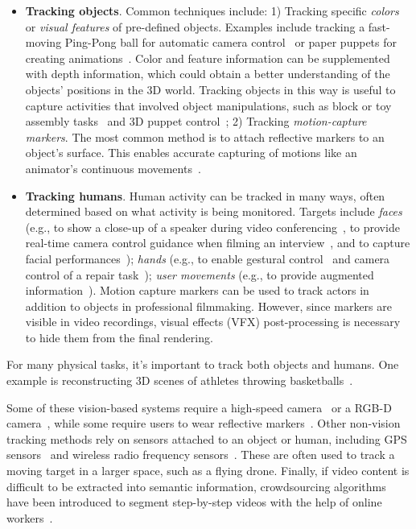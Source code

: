 \begin{itemize}
  \item \textbf{Tracking objects}. Common techniques include:
  1) Tracking specific \emph{colors} or \emph{visual features} of pre-defined objects. Examples include tracking a fast-moving Ping-Pong ball for automatic camera control~\cite{Okumura:2011tr} or paper puppets for creating animations~\cite{Barnes:2008:VideoPuppetry}.
  Color and feature information can be supplemented with depth information, which could obtain a better understanding of the objects’ positions in the 3D world. Tracking objects in this way is useful to capture activities that involved object manipulations, such as block or toy assembly tasks~\cite{Gupta2012DuploTrack,Wu:2016:ARI:2856400.2856416} and 3D puppet control~\cite{held20123d};
  2) Tracking \emph{motion-capture markers}. The most common method is to attach reflective markers to an object's surface. This enables accurate capturing of motions like an animator's continuous movements~\cite{Dontcheva:2003:LAC:1201775.882285}.
  \item \textbf{Tracking humans}. Human activity can be tracked in many ways, often determined based on what activity is being monitored.
  Targets include \emph{faces} (e.g., to show a close-up of a speaker during video conferencing~\cite{Ranjan:2010}, to provide real-time camera control guidance when filming an interview~\cite{Carter:2010}, and to capture facial performances~\cite{Shi:2014:AAH:2661229.2661290,thies2016face}); \emph{hands} (e.g., to enable gestural control~\cite{taylor-siggraph2016} and camera control of a repair task~\cite{Ranjan:2008}); \emph{user movements} (e.g., to provide augmented information~\cite{Wilson:2012fb,Anderson:2013:YEM:2501988.2502045}).
  Motion capture markers can be used to track actors in addition to objects in professional filmmaking. However, since markers are visible in video recordings, visual effects (VFX) post-processing is necessary to hide them from the final rendering.
\end{itemize}

For many physical tasks, it's important to track both objects and humans. One example is reconstructing 3D scenes of athletes throwing basketballs~\cite{dou-siggraph2016}.

Some of these vision-based systems require a high-speed camera~\cite{Okumura:2011tr} or a RGB-D camera~\cite{Gupta2012DuploTrack,Wu:2016:ARI:2856400.2856416,held20123d,Wilson:2012fb,Anderson:2013:YEM:2501988.2502045,dou-siggraph2016}, while some require users to wear reflective markers~\cite{Ranjan:2008}.
%
Other non-vision tracking methods rely on sensors attached to an object or human, including GPS sensors~\cite{HexoDrone} and wireless radio frequency sensors~\cite{Nguyen:2016:ICR:2935620.2935632}. These are often used to track a moving target in a larger space, such as a flying drone.
%
Finally, if video content is difficult to be extracted into semantic information, crowdsourcing algorithms have been introduced to segment step-by-step videos with the help of online workers~\cite{Kim:2014:CSI:2611222.2556986}.

